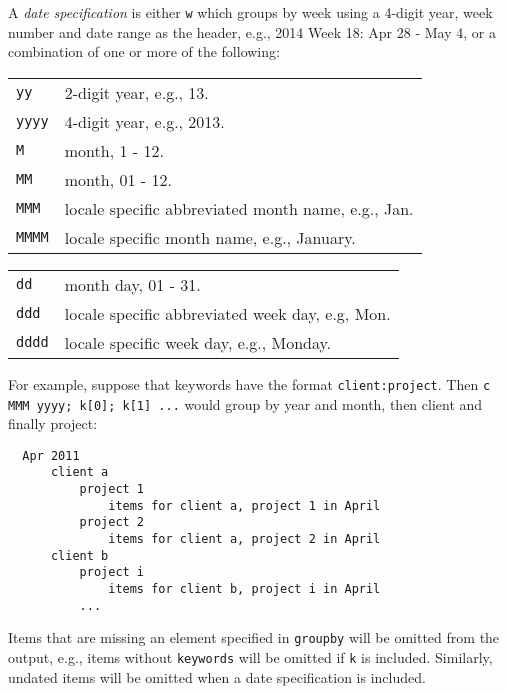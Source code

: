 \documentclass[9pt,landscape]{article}
\begin{document}
\begin{multicols}{3}
\vskip3pt
A \emph{date specification} is either \texttt{w} which groups by week using a  4-digit year, week number and date range as the header, e.g., 2014 Week 18: Apr 28 - May 4, or a combination of one or more of the following:
\vskip3pt

\begin{tabular}{@{}ll@{}}
\texttt{yy} & 2-digit year, e.g., 13. \\
\texttt{yyyy} & 4-digit year, e.g., 2013. \\
\texttt{M} & month, 1 - 12. \\
\texttt{MM} & month, 01 - 12. \\
\texttt{MMM} & locale specific abbreviated month name, e.g., Jan. \\
\texttt{MMMM} & locale specific month name, e.g., January. \\
\end{tabular}
\begin{tabular}{@{}ll@{}}
\texttt{dd} & month day, 01 - 31. \\
\texttt{ddd} & locale specific abbreviated week day, e.g, Mon. \\
\texttt{dddd} & locale specific week day, e.g., Monday. \\
\end{tabular}

\vskip3pt
For example, suppose that keywords have the format \verb!client:project!. Then \verb!c MMM yyyy; k[0]; k[1] ...! would group by year and month, then client and finally project:
\begin{verbatim}
  Apr 2011
      client a
          project 1
              items for client a, project 1 in April
          project 2
              items for client a, project 2 in April
      client b
          project i
              items for client b, project i in April
          ...
\end{verbatim}

Items that are missing an element specified in \verb'groupby' will be omitted from the output, e.g., items without \verb'keywords' will be omitted if \verb'k' is included. Similarly, undated items will be omitted when a date specification is included.


\end{multicols}
\end{document}
